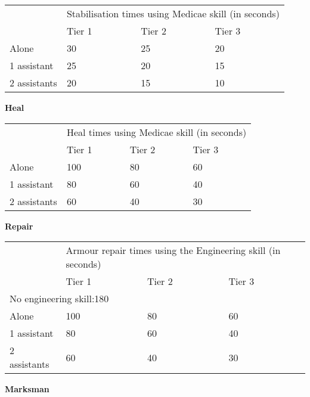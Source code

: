 \documentclass{scrbook}
\begin{document}
\begin{table}
\begin{tabular}{|l|l|l|l|} \hline 
\multirow{1}{*}{}& \multicolumn{3}{|l|}{Stabilisation times using Medicae skill (in seconds)} \\
\cline{2-2}\cline{3-3}\cline{4-4} & Tier 1 & Tier 2 & Tier 3 \\
 \hline Alone & 30 & 25 & 20 \\
 \hline 1 assistant & 25 & 20 & 15 \\
 \hline 2 assistants & 20 & 15 & 10 \\
 \hline \end{tabular}

\end{table}

\textbf{Heal}

\begin{table}
\begin{tabular}{|l|l|l|l|} \hline 
\multirow{1}{*}{}& \multicolumn{3}{|l|}{Heal times using Medicae skill (in seconds)} \\
\cline{2-2}\cline{3-3}\cline{4-4} & Tier 1 & Tier 2 & Tier 3 \\
 \hline Alone & 100 & 80 & 60 \\
 \hline 1 assistant & 80 & 60 & 40 \\
 \hline 2 assistants & 60 & 40 & 30 \\
 \hline \end{tabular}

\end{table}

\textbf{Repair}

\begin{table}
\begin{tabular}{|l|l|l|l|} \hline 
\multirow{1}{*}{}& \multicolumn{3}{|l|}{Armour repair times using the Engineering skill (in seconds)} \\
\cline{2-2}\cline{3-3}\cline{4-4} & Tier 1 & Tier 2 & Tier 3 \\
 \hline \multicolumn{4}{|l|}{	No engineering skill:180} \\
 \hline Alone & 100 & 80 & 60 \\
 \hline 1 assistant & 80 & 60 & 40 \\
 \hline 2 assistants & 60 & 40 & 30 \\
 \hline \end{tabular}

\end{table}

\textbf{Marksman}
\end{document}

